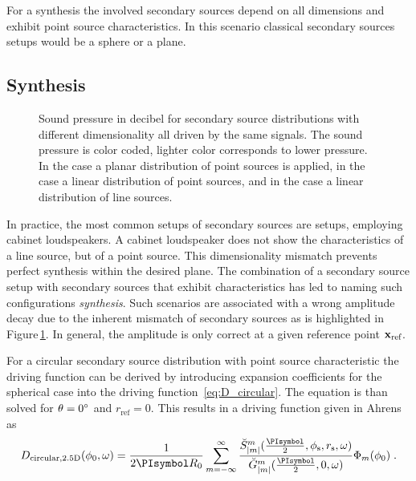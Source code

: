 For a \threeD synthesis the involved secondary sources depend on all dimensions
and exhibit point source characteristics. In this scenario
classical secondary sources setups would be a sphere or a plane.

\subsection{\twohalfD Synthesis}
\label{sec:25d_synthesis}
%
\begin{figure}
    \centering
    \small
    \caption{Sound pressure in decibel for secondary source distributions with different
    dimensionality all driven by the same signals. The sound pressure is color
    coded, lighter color corresponds to lower pressure.
    In the \threeD case a planar distribution of point sources is applied,
    in the \twohalfD case a linear distribution of point sources, and in the \twoD
    case a linear distribution of line sources.
    }
    \label{fig:sound_field_dimensionality}
\end{figure}
%
In practice, the most common setups of secondary sources are \twoD setups,
employing cabinet loudspeakers. A cabinet loudspeaker does not show the characteristics
of a line source, but of a point source. This dimensionality mismatch prevents perfect
synthesis within the desired plane. The combination of a \twoD secondary source
setup with secondary
sources that exhibit \threeD characteristics has led to naming such
configurations
\emph{\twohalfD synthesis}. Such scenarios
are associated with a wrong amplitude decay due to the inherent mismatch of secondary
sources as is highlighted in Figure\,\ref{fig:sound_field_dimensionality}.
In general, the amplitude is only correct at a given reference point
$\mathbf{x}_\text{ref}$.

For a circular secondary source distribution with point source characteristic
the \twohalfD driving function
can be derived by introducing expansion coefficients for the spherical case
into the driving function~\eqref{eq:D_circular}. The equation is than solved
for $\theta = 0^\circ$ and $r_\text{ref} = 0$. This
results in a \twohalfD driving function given in
Ahrens\autocite[][(3.49)]{Ahrens2012} as
%
\begin{equation}
    D_{\text{circular},\twohalfD}(\phi_0,\omega) = \frac{1}{2\PI R_0} \sum_{m=-\infty}^\infty
    \frac{\breve{S}_{|m|}^m (\frac{\PI}{2},\phi_\text{s},r_\text{s},\omega)}{\breve{G}_{|m|}^m
    (\frac{\PI}{2},0,\omega)}
    \Phi_m(\phi_0) \qp
    \label{eq:D_circular_25D}
\end{equation}
%

